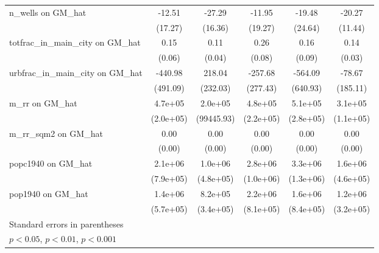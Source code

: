 \begin{table}[htbp]
\begin{tabular}{l*{5}{c}}
\addlinespace
n\_wells on GM\_hat&   -12.51         &   -27.29         &   -11.95         &   -19.48         &   -20.27         \\
                &  (17.27)         &  (16.36)         &  (19.27)         &  (24.64)         &  (11.44)         \\
\addlinespace
totfrac\_in\_main\_city on GM\_hat&     0.15\sym{*}  &     0.11\sym{**} &     0.26\sym{**} &     0.16         &     0.14\sym{***}\\
                &   (0.06)         &   (0.04)         &   (0.08)         &   (0.09)         &   (0.03)         \\
\addlinespace
urbfrac\_in\_main\_city on GM\_hat&  -440.98         &   218.04         &  -257.68         &  -564.09         &   -78.67         \\
                & (491.09)         & (232.03)         & (277.43)         & (640.93)         & (185.11)         \\
\addlinespace
m\_rr on GM\_hat  &  4.7e+05\sym{*}  &  2.0e+05\sym{*}  &  4.8e+05\sym{*}  &  5.1e+05         &  3.1e+05\sym{**} \\
                &(2.0e+05)         &(99445.93)         &(2.2e+05)         &(2.8e+05)         &(1.1e+05)         \\
\addlinespace
m\_rr\_sqm2 on GM\_hat&     0.00\sym{*}  &     0.00\sym{**} &     0.00\sym{**} &     0.00         &     0.00\sym{***}\\
                &   (0.00)         &   (0.00)         &   (0.00)         &   (0.00)         &   (0.00)         \\
\addlinespace
popc1940 on GM\_hat&  2.1e+06\sym{**} &  1.0e+06\sym{*}  &  2.8e+06\sym{**} &  3.3e+06\sym{*}  &  1.6e+06\sym{***}\\
                &(7.9e+05)         &(4.8e+05)         &(1.0e+06)         &(1.3e+06)         &(4.6e+05)         \\
\addlinespace
pop1940 on GM\_hat&  1.4e+06\sym{*}  &  8.2e+05\sym{*}  &  2.2e+06\sym{**} &  1.6e+06         &  1.2e+06\sym{***}\\
                &(5.7e+05)         &(3.4e+05)         &(8.1e+05)         &(8.4e+05)         &(3.2e+05)         \\
\bottomrule
\multicolumn{6}{l}{\footnotesize Standard errors in parentheses}\\
\multicolumn{6}{l}{\footnotesize \sym{*} \(p<0.05\), \sym{**} \(p<0.01\), \sym{***} \(p<0.001\)}\\
\end{tabular}
\end{table}

